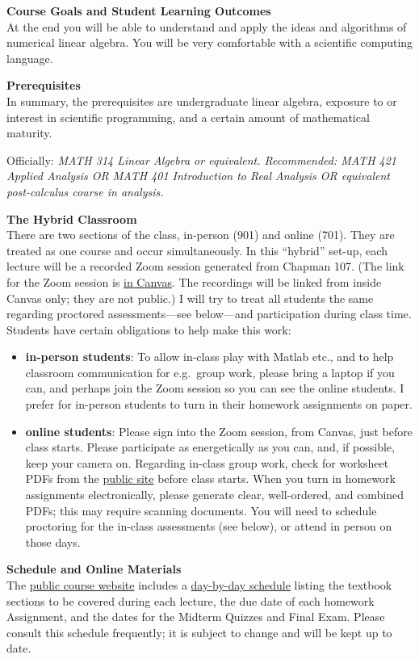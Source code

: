 \documentclass[12pt]{article}
\renewcommand{\emph}[1]{\textsf{\textbf{#1}}}
\newcommand{\localhead}[1]{\par\smallskip\textbf{#1} \smallskip\nobreak\\}%
\def\heading#1{\localhead{\large\emph{#1}}}
\begin{document}
\heading{Course Goals and Student Learning Outcomes}
At the end you will be able to understand and apply the ideas and algorithms of numerical linear algebra.  You will be very comfortable with a scientific computing language.


\clearpage \newpage
\phantom{foo}
\heading{Prerequisites}
In summary, the prerequisites are undergraduate linear algebra, exposure to or interest in scientific programming, and a certain amount of mathematical maturity.

Officially: \textsl{MATH 314 Linear Algebra or equivalent.  Recommended: MATH 421 Applied Analysis OR MATH 401 Introduction to Real Analysis OR equivalent post-calculus course in analysis.}


\heading{The Hybrid Classroom}
There are two sections of the class, in-person (901) and online (701).  They are treated as one course and occur simultaneously.  In this ``hybrid'' set-up, each lecture will be a recorded Zoom session generated from Chapman 107.  (The link for the Zoom session is \href{https://canvas.alaska.edu/courses/27130}{in Canvas}.  The recordings will be linked from inside Canvas only; they are not public.)  I will try to treat all students the same regarding proctored assessments---see below---and participation during class time.  Students have certain obligations to help make this work:
\begin{itemize}
\item \textbf{in-person students}: To allow in-class play with Matlab etc., and to help classroom communication for e.g.~group work, please bring a laptop if you can, and perhaps join the Zoom session so you can see the online students.  I prefer for in-person students to turn in their homework assignments on paper.
\item \textbf{online students}: Please sign into the Zoom session, from Canvas, just before class starts.  Please participate as energetically as you can, and, if possible, keep your camera on.  Regarding in-class group work, check for worksheet PDFs from the \href{https://bueler.github.io/nla/}{public site} before class starts.  When you turn in homework assignments electronically, please generate clear, well-ordered, and combined PDFs; this may require scanning documents.  You will need to schedule proctoring for the in-class assessments (see below), or attend in person on those days.
\end{itemize}


\heading{Schedule and Online Materials}
The \href{https://bueler.github.io/nla/}{public course website} includes a \href{https://bueler.github.io/nla/assets/general/F25/schedule.pdf}{day-by-day schedule} listing the textbook sections to be covered during each lecture, the due date of each homework Assignment, and the dates for the Midterm Quizzes and Final Exam.  Please consult this schedule frequently; it is subject to change and will be kept up to date.
\end{document}
